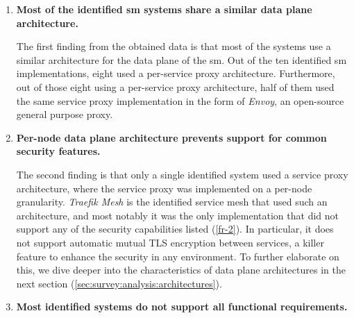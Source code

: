 \begin{enumerate}[label=\textbf{F\arabic*}, leftmargin=3\parindent]
    \item \textbf{Most of the identified \gls{sm} systems share a similar data plane architecture.}
    \label{f-1}
    
    The first finding from the obtained data is that most of the systems use a similar architecture for the data plane of the \gls{sm}. Out of the ten identified \gls{sm} implementations, eight used a per-service proxy architecture. Furthermore, out of those eight using a per-service proxy architecture, half of them used the same service proxy implementation in the form of \textit{Envoy}, an open-source general purpose proxy.
    
    \item \textbf{Per-node data plane architecture prevents support for common security features.}
    \label{f-2}
    
    The second finding is that only a single identified system used a service proxy architecture, where the service proxy was implemented on a per-node granularity. \textit{Traefik Mesh} is the identified service mesh that used such an architecture, and most notably it was the only implementation that did not support any of the security capabilities listed (\ref{fr-2}). In particular, it does not support automatic mutual TLS encryption between services, a killer feature to enhance the security in any environment. To further elaborate on this, we dive deeper into the characteristics of data plane architectures in the next section (\cref{sec:survey:analysis:architectures}).

    \item \textbf{Most identified systems do not support all functional requirements.}
    \label{f-3}
    

\end{enumerate}
